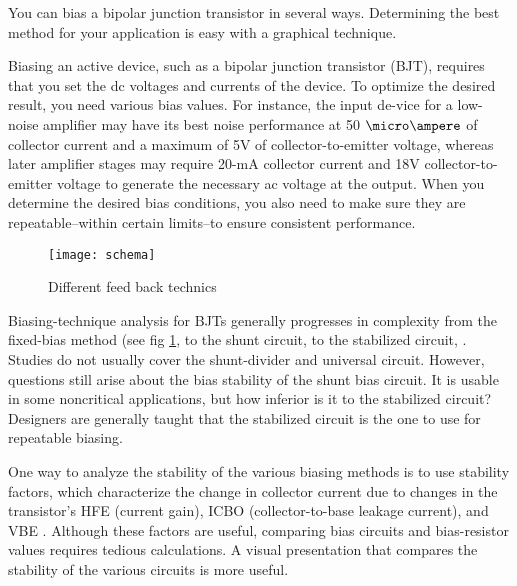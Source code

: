 %
%
%
%

You can bias a bipolar junction transistor in several ways. Determining the best method for your application is easy with a graphical technique.

Biasing an active device, such as a bipolar junction transistor (BJT), requires that you set the dc voltages and currents of the device. To optimize the desired result, you need various bias values. For instance, the input de-vice for a low-noise amplifier may have its best noise performance at 50 $\micro\ampere$ of collector current and a maximum of 5V of collector-to-emitter voltage, whereas later amplifier stages may require 20-mA collector current and 18V collector-to-emitter voltage to generate the necessary ac voltage at the output. When you determine the desired bias conditions, you also need to make sure they are repeatable--within certain limits--to ensure consistent performance.

\begin{figure}[htbp]
\begin{center}
	\texttt{[image: schema]}
	\caption{Different feed back technics}
	\label{design:bjt:bias:schemas}
\end{center}
\end{figure}

Biasing-technique analysis for BJTs generally progresses in complexity from the fixed-bias method (see fig \ref{design:bjt:bias:schemas}, to the shunt circuit, to the stabilized circuit, . Studies do not usually cover the shunt-divider  and universal  circuit. However, questions still arise about the bias stability of the shunt bias circuit. It is usable in some noncritical applications, but how inferior is it to the stabilized circuit? Designers are generally taught that the stabilized circuit is the one to use for repeatable biasing.

\bigskip

One way to analyze the stability of the various biasing methods is to use stability factors, which characterize the change in collector current due to changes in the transistor's HFE (current gain), ICBO (collector-to-base leakage current), and VBE . Although these factors are useful, comparing bias circuits and bias-resistor values requires tedious calculations. A visual presentation that compares the stability of the various circuits is more useful.

